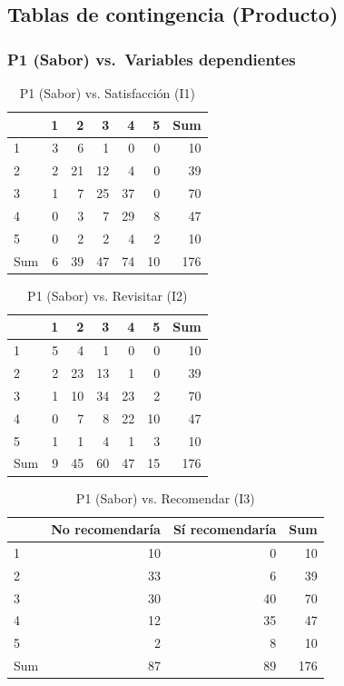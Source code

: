 \documentclass[
  spanish,
]{article}
\begin{document}
\newpage

\subsection{Tablas de contingencia
(Producto)}\label{tablas-de-contingencia-producto}

\subsubsection{P1 (Sabor) vs.~Variables
dependientes}\label{p1-sabor-vs.-variables-dependientes}

\begin{longtable}[t]{lrrrrrr}
\caption{\label{tab:cont-p1-satisf}P1 (Sabor) vs. Satisfacción (I1)}\\
\toprule
 & 1 & 2 & 3 & 4 & 5 & Sum\\
\midrule
1 & 3 & 6 & 1 & 0 & 0 & 10\\
2 & 2 & 21 & 12 & 4 & 0 & 39\\
3 & 1 & 7 & 25 & 37 & 0 & 70\\
4 & 0 & 3 & 7 & 29 & 8 & 47\\
5 & 0 & 2 & 2 & 4 & 2 & 10\\
\addlinespace
Sum & 6 & 39 & 47 & 74 & 10 & 176\\
\bottomrule
\end{longtable}

\begin{longtable}[t]{lrrrrrr}
\caption{\label{tab:cont-p1-revis}P1 (Sabor) vs. Revisitar (I2)}\\
\toprule
 & 1 & 2 & 3 & 4 & 5 & Sum\\
\midrule
1 & 5 & 4 & 1 & 0 & 0 & 10\\
2 & 2 & 23 & 13 & 1 & 0 & 39\\
3 & 1 & 10 & 34 & 23 & 2 & 70\\
4 & 0 & 7 & 8 & 22 & 10 & 47\\
5 & 1 & 1 & 4 & 1 & 3 & 10\\
\addlinespace
Sum & 9 & 45 & 60 & 47 & 15 & 176\\
\bottomrule
\end{longtable}

\begin{longtable}[t]{lrrr}
\caption{\label{tab:cont-p1-recom}P1 (Sabor) vs. Recomendar (I3)}\\
\toprule
 & No recomendaría & Sí recomendaría & Sum\\
\midrule
1 & 10 & 0 & 10\\
2 & 33 & 6 & 39\\
3 & 30 & 40 & 70\\
4 & 12 & 35 & 47\\
5 & 2 & 8 & 10\\
\addlinespace
Sum & 87 & 89 & 176\\
\bottomrule
\end{longtable}
\end{document}
